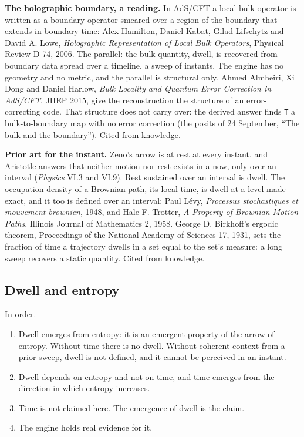\textbf{The holographic boundary, a reading.} In AdS/CFT a local bulk operator is written as a boundary operator smeared over a region of the boundary that extends in boundary time: Alex Hamilton, Daniel Kabat, Gilad Lifschytz and David A. Lowe, \emph{Holographic Representation of Local Bulk Operators}, Physical Review D 74, 2006. The parallel: the bulk quantity, dwell, is recovered from boundary data spread over a timeline, a sweep of instants. The engine has no geometry and no metric, and the parallel is structural only. Ahmed Almheiri, Xi Dong and Daniel Harlow, \emph{Bulk Locality and Quantum Error Correction in AdS/CFT}, JHEP 2015, give the reconstruction the structure of an error-correcting code. That structure does not carry over: the derived answer finds \texttt{T} a bulk-to-boundary map with no error correction (the posits of 24 September, “The bulk and the boundary”). Cited from knowledge.

\textbf{Prior art for the instant.} Zeno's arrow is at rest at every instant, and Aristotle answers that neither motion nor rest exists in a now, only over an interval (\emph{Physics} VI.3 and VI.9). Rest sustained over an interval is dwell. The occupation density of a Brownian path, its local time, is dwell at a level made exact, and it too is defined over an interval: Paul Lévy, \emph{Processus stochastiques et mouvement brownien}, 1948, and Hale F. Trotter, \emph{A Property of Brownian Motion Paths}, Illinois Journal of Mathematics 2, 1958. George D. Birkhoff's ergodic theorem, Proceedings of the National Academy of Sciences 17, 1931, sets the fraction of time a trajectory dwells in a set equal to the set's measure: a long sweep recovers a static quantity. Cited from knowledge.

\subsection{\texorpdfstring{Dwell and entropy}{Dwell and entropy}}

In order.

\begin{enumerate}
\item Dwell emerges from entropy: it is an emergent property of the arrow of entropy. Without time there is no dwell. Without coherent context from a prior sweep, dwell is not defined, and it cannot be perceived in an instant.
\item Dwell depends on entropy and not on time, and time emerges from the direction in which entropy increases.
\item Time is not claimed here. The emergence of dwell is the claim.
\item The engine holds real evidence for it.
\end{enumerate}

